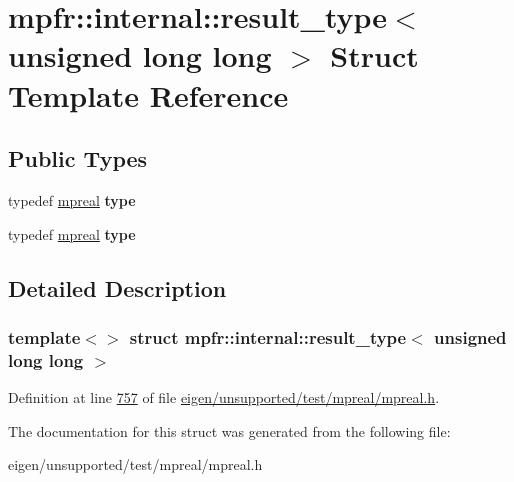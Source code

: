 \hypertarget{structmpfr_1_1internal_1_1result__type_3_01unsigned_01long_01long_01_4}{}\section{mpfr\+:\+:internal\+:\+:result\+\_\+type$<$ unsigned long long $>$ Struct Template Reference}
\label{structmpfr_1_1internal_1_1result__type_3_01unsigned_01long_01long_01_4}
\subsection*{Public Types}
\begin{DoxyCompactItemize}
\item 
\mbox{\label{structmpfr_1_1internal_1_1result__type_3_01unsigned_01long_01long_01_4_a099814ad3ac7cf8c9dc6d7ed176e3b91}} 
typedef \hyperlink{classmpfr_1_1mpreal}{mpreal} {\bfseries type}
\item 
\mbox{\label{structmpfr_1_1internal_1_1result__type_3_01unsigned_01long_01long_01_4_a099814ad3ac7cf8c9dc6d7ed176e3b91}} 
typedef \hyperlink{classmpfr_1_1mpreal}{mpreal} {\bfseries type}
\end{DoxyCompactItemize}


\subsection{Detailed Description}
\subsubsection*{template$<$$>$\newline
struct mpfr\+::internal\+::result\+\_\+type$<$ unsigned long long $>$}



Definition at line \hyperlink{eigen_2unsupported_2test_2mpreal_2mpreal_8h_source_l00757}{757} of file \hyperlink{eigen_2unsupported_2test_2mpreal_2mpreal_8h_source}{eigen/unsupported/test/mpreal/mpreal.\+h}.



The documentation for this struct was generated from the following file\+:\begin{DoxyCompactItemize}
\item 
eigen/unsupported/test/mpreal/mpreal.\+h\end{DoxyCompactItemize}
